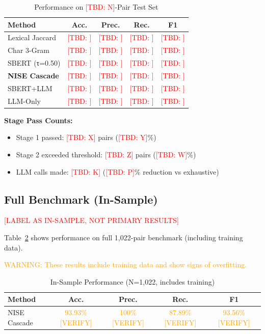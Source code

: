 \documentclass[conference]{IEEEtran}
\newcommand{\tbd}[1]{\textcolor{red}{[TBD: #1]}}
\newcommand{\verify}[1]{\textcolor{orange}{#1 [VERIFY]}}
\begin{document}
\begin{table}[h]
\centering
\caption{Performance on \tbd{N}-Pair Test Set}
\label{tab:test}
\begin{tabular}{lcccc}
\toprule
Method & Acc. & Prec. & Rec. & F1 \\
\midrule
Lexical Jaccard & \tbd{} & \tbd{} & \tbd{} & \tbd{} \\
Char 3-Gram & \tbd{} & \tbd{} & \tbd{} & \tbd{} \\
SBERT (τ=0.50) & \tbd{} & \tbd{} & \tbd{} & \tbd{} \\
\textbf{NISE Cascade} & \tbd{} & \tbd{} & \tbd{} & \tbd{} \\
SBERT+LLM & \tbd{} & \tbd{} & \tbd{} & \tbd{} \\
LLM-Only & \tbd{} & \tbd{} & \tbd{} & \tbd{} \\
\bottomrule
\end{tabular}
\end{table}

\textbf{Stage Pass Counts:}
\begin{itemize}
    \item Stage 1 passed: \tbd{X} pairs (\tbd{Y}\%)
    \item Stage 2 exceeded threshold: \tbd{Z} pairs (\tbd{W}\%)
    \item LLM calls made: \tbd{K} (\tbd{P}\% reduction vs exhaustive)
\end{itemize}

\subsection{Full Benchmark (In-Sample)}

\textcolor{red}{[LABEL AS IN-SAMPLE, NOT PRIMARY RESULTS]}

Table~\ref{tab:full} shows performance on full 1,022-pair benchmark (including training data).

\textcolor{orange}{WARNING: These results include training data and show signs of overfitting.}

\begin{table}[h]
\centering
\caption{In-Sample Performance (N=1,022, includes training)}
\label{tab:full}
\begin{tabular}{lcccc}
\toprule
Method & Acc. & Prec. & Rec. & F1 \\
\midrule
NISE Cascade & \verify{93.93\%} & \verify{100\%} & \verify{87.89\%} & \verify{93.56\%} \\
\bottomrule
\end{tabular}
\end{table}
\end{document}
